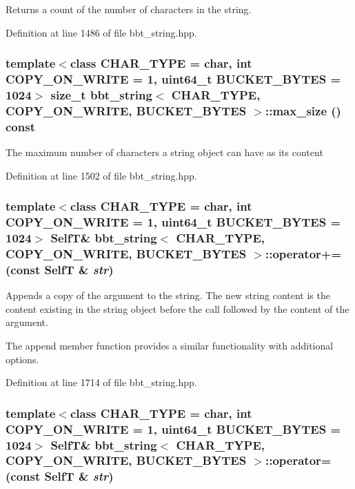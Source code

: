 Returns a count of the number of characters in the string. 

Definition at line 1486 of file bbt\_\-string.hpp.\hypertarget{classbbt__string_dad344768ef0b5b3349b37360ddf635c}{
\subsubsection[{max\_\-size}]{\setlength{\rightskip}{0pt plus 5cm}template$<$class CHAR\_\-TYPE  = char, int COPY\_\-ON\_\-WRITE = 1, uint64\_\-t BUCKET\_\-BYTES = 1024$>$ size\_\-t {\bf bbt\_\-string}$<$ CHAR\_\-TYPE, COPY\_\-ON\_\-WRITE, BUCKET\_\-BYTES $>$::max\_\-size () const}}
\label{classbbt__string_dad344768ef0b5b3349b37360ddf635c}


The maximum number of characters a string object can have as its content 

Definition at line 1502 of file bbt\_\-string.hpp.\hypertarget{classbbt__string_0b1409c335c490f060472fe47c90cfd2}{
\subsubsection[{operator+=}]{\setlength{\rightskip}{0pt plus 5cm}template$<$class CHAR\_\-TYPE  = char, int COPY\_\-ON\_\-WRITE = 1, uint64\_\-t BUCKET\_\-BYTES = 1024$>$ {\bf SelfT}\& {\bf bbt\_\-string}$<$ CHAR\_\-TYPE, COPY\_\-ON\_\-WRITE, BUCKET\_\-BYTES $>$::operator+= (const {\bf SelfT} \& {\em str})}}
\label{classbbt__string_0b1409c335c490f060472fe47c90cfd2}


Appends a copy of the argument to the string. The new string content is the content existing in the string object before the call followed by the content of the argument.

The append member function provides a similar functionality with additional options. 

Definition at line 1714 of file bbt\_\-string.hpp.\hypertarget{classbbt__string_127c0d9e38d27260065d2b8a24cb78c1}{
\subsubsection[{operator=}]{\setlength{\rightskip}{0pt plus 5cm}template$<$class CHAR\_\-TYPE  = char, int COPY\_\-ON\_\-WRITE = 1, uint64\_\-t BUCKET\_\-BYTES = 1024$>$ {\bf SelfT}\& {\bf bbt\_\-string}$<$ CHAR\_\-TYPE, COPY\_\-ON\_\-WRITE, BUCKET\_\-BYTES $>$::operator= (const {\bf SelfT} \& {\em str})}}
\label{classbbt__string_127c0d9e38d27260065d2b8a24cb78c1}


